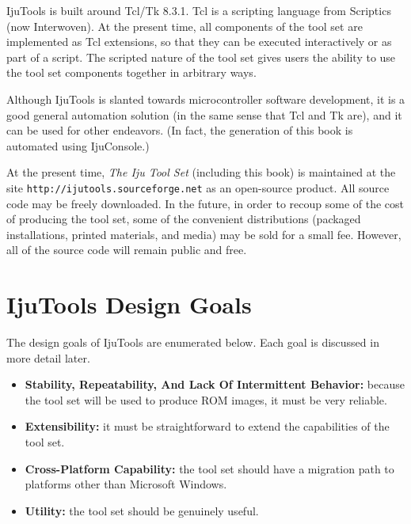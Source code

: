 IjuTools is built around Tcl/Tk 8.3.1.
Tcl is a scripting language from 
Scriptics (now Interwoven).
At the present time,
all components of the tool set are implemented
as Tcl extensions, so that they can be executed interactively or as part of
a script.  The scripted nature of the tool set gives users the ability to
use the tool set components together in arbitrary ways.

Although IjuTools is slanted towards microcontroller software development,
it is a good general automation solution (in the same sense that
Tcl and Tk are), and it can be used for other endeavors.  (In fact,
the generation of this book is automated using IjuConsole.)

At the present time, \emph{The Iju Tool Set} (including this
book) is maintained
at the site \texttt{http://ijutools.sourceforge.net} as an
open-source product.  All source code may be freely downloaded.
In the future, in order to recoup some of the cost of producing
the tool set, some of the convenient distributions (packaged installations,
printed materials, and media) may be sold
for a small fee.  However, all of the source code will remain
public and free.


\section{IjuTools Design Goals}
The design goals of IjuTools are enumerated below.  
Each goal is discussed in more detail later.

\begin{itemize}

\item \textbf{Stability, Repeatability, And Lack Of Intermittent Behavior:}  
      because the tool set will be used to produce ROM images, it must be very reliable.

\item \textbf{Extensibility:}
      it must be straightforward to extend the capabilities of the tool set.

\item \textbf{Cross-Platform Capability:}
      the tool set should have a migration path to platforms other than Microsoft
      Windows.

\item \textbf{Utility:}
      the tool set should be genuinely useful.

\end{itemize}

